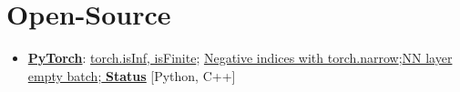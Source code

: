 \documentclass[a4paper, 11pt]{article}
\newcommand{\resumeItem}[2]{
  \item\small{
    \textbf{#1}{: #2 \vspace{-2pt}}
  }
}
\newcommand{\resumeSubItem}[2]{\resumeItem{#1}{#2}\vspace{-4pt}}
\newcommand{\resumeSubHeadingListStart}{\begin{itemize}[leftmargin=*]}
\newcommand{\resumeItemListEnd}{\end{itemize}\vspace{-5pt}}
\begin{document}
\section{Open-Source}
\resumeSubHeadingListStart
\resumeSubItem{\href{https://github.com/pytorch/pytorch}{PyTorch}}{\href{https://github.com/pytorch/pytorch/issues/9132}{torch.isInf, isFinite}; \href{https://github.com/pytorch/pytorch/issues/9546}{Negative indices with torch.narrow};\href{https://github.com/pytorch/pytorch/issues/12013}{NN layer empty batch};\href{https://docs.google.com/spreadsheets/d/1oFntDigXwlkAzJH_T6XagQD6ia-9H4YmqZMTWmPbz8w/edit?usp=sharing}{ \textbf{\underline{Status}}} [Python, C++]}
\resumeItemListEnd


\end{document}
